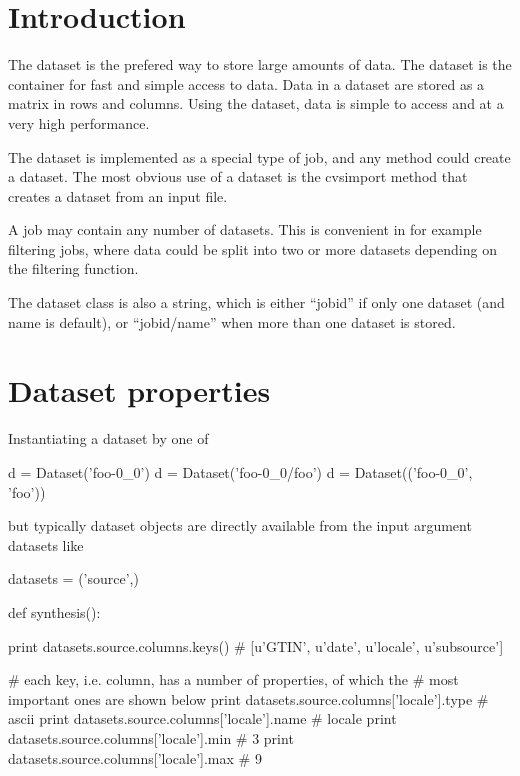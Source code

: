 \section{Introduction}
The dataset is the prefered way to store large amounts of data.  The
dataset is the container for fast and simple access to data.  Data in
a dataset are stored as a matrix in rows and columns.  Using the
dataset, data is simple to access and at a very high performance.

The dataset is implemented as a special type of job, and any method
could create a dataset.  The most obvious use of a dataset is the
cvsimport method that creates a dataset from an input file.

A job may contain any number of datasets.  This is convenient in for
example filtering jobs, where data could be split into two or more
datasets depending on the filtering function.

The dataset class is also a string, which is either ``jobid'' if only
one dataset (and name is default), or ``jobid/name'' when more than
one dataset is stored.







\section{Dataset properties}

Instantiating a dataset by one of

\begin{python}
d = Dataset('foo-0_0')
d = Dataset('foo-0_0/foo')
d = Dataset(('foo-0_0', 'foo'))
\end{python}
but typically dataset objects are directly available from the input
argument datasets like

\begin{python}
datasets = ('source',)

def synthesis():
\end{python}

\begin{python}
  print datasets.source.columns.keys()
  # [u'GTIN', u'date', u'locale', u'subsource']

  # each key, i.e. column, has a number of properties, of which the
  # most important ones are shown below
  print datasets.source.columns['locale'].type
  # ascii
  print datasets.source.columns['locale'].name
  # locale
  print datasets.source.columns['locale'].min
  # 3
  print datasets.source.columns['locale'].max
  # 9
  
\end{python}

